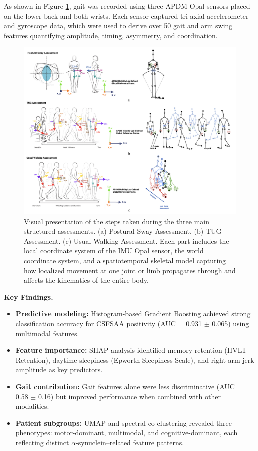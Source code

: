 \documentclass[11pt]{article}
\begin{document}
As shown in Figure \ref{fig:gaitassessments}, gait was recorded using three APDM Opal sensors placed on the lower back and both wrists. Each sensor captured tri-axial accelerometer and gyroscope data, which were used to derive over 50 gait and arm swing features quantifying amplitude, timing, asymmetry, and coordination.

\begin{figure}[h!]
    \centering
    \includegraphics[width=1\linewidth]{figures/gaitassessments.png}
    \caption{Visual presentation of the steps taken during the three main structured assessments. (a) Postural Sway Assessment. (b) TUG Assessment. (c) Usual Walking Assessment. Each part includes the local coordinate system of the IMU Opal sensor, the world coordinate system, and a spatiotemporal skeletal model capturing how localized movement at one joint or limb propagates through and affects the kinematics of the entire body.}
    \label{fig:gaitassessments}
\end{figure}

\textbf{Key Findings.}
\begin{itemize}
    \item \textbf{Predictive modeling:} Histogram-based Gradient Boosting achieved strong classification accuracy for CSFSAA positivity (AUC = 0.931 $\pm$ 0.065) using multimodal features.
    \item \textbf{Feature importance:} SHAP analysis identified memory retention (HVLT-Retention), daytime sleepiness (Epworth Sleepiness Scale), and right arm jerk amplitude as key predictors.
    \item \textbf{Gait contribution:} Gait features alone were less discriminative (AUC = 0.58 $\pm$ 0.16) but improved performance when combined with other modalities.
    \item \textbf{Patient subgroups:} UMAP and spectral co-clustering revealed three phenotypes: motor-dominant, multimodal, and cognitive-dominant, each reflecting distinct $\alpha$-synuclein–related feature patterns.
\end{itemize}
\end{document}
